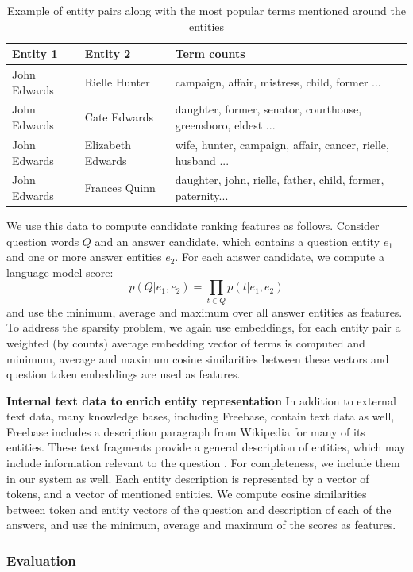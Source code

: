 \begin{table}
\centering
\begin{tabular}{| p{3.5cm} | p{3.5cm} | p{9cm} |}
\hline
Entity 1 & Entity 2 & Term counts\\
\hline
John Edwards & Rielle Hunter & campaign, affair, mistress, child, former ...\\
\hline
John Edwards & Cate Edwards & daughter, former, senator, courthouse, greensboro, eldest ...\\
\hline
John Edwards & Elizabeth Edwards & wife, hunter, campaign, affair, cancer, rielle, husband ...\\
\hline
John Edwards & Frances Quinn & daughter, john, rielle, father, child, former, paternity...\\
\hline
\end{tabular}
\caption{Example of entity pairs along with the most popular terms mentioned around the entities}
\label{table:text2kb:clueweb_entitypairs_langmodel}
\end{table}

We use this data to compute candidate ranking features as follows.
Consider question words $Q$ and an answer candidate, which contains a question entity $e_1$ and one or more answer entities $e_2$.
For each answer candidate, we compute a language model score:
$$p(Q|e_1, e_2) = \prod_{t\in Q} p(t | e_1, e_2)$$
and use the minimum, average and maximum over all answer entities as features.
To address the sparsity problem, we again use embeddings, 
\ie for each entity pair a weighted (by counts) average embedding vector of terms is computed and minimum, average and maximum cosine similarities between these vectors and question token embeddings are used as features.

\textbf{Internal text data to enrich entity representation}
In addition to external text data, many knowledge bases, including Freebase, contain text data as well, \eg Freebase includes a description paragraph from Wikipedia for many of its entities.
These text fragments provide a general description of entities, which may include information relevant to the question \cite{Sun:2015:ODQ:2736277.2741651}.
For completeness, we include them in our system as well.
Each entity description is represented by a vector of tokens, and a vector of mentioned entities.
We compute cosine similarities between token and entity vectors of the question and description of each of the answers, and use the minimum, average and maximum of the scores as features.

\subsubsection{Evaluation}
\label{section:factoid:approaches:text2kb:eval}

